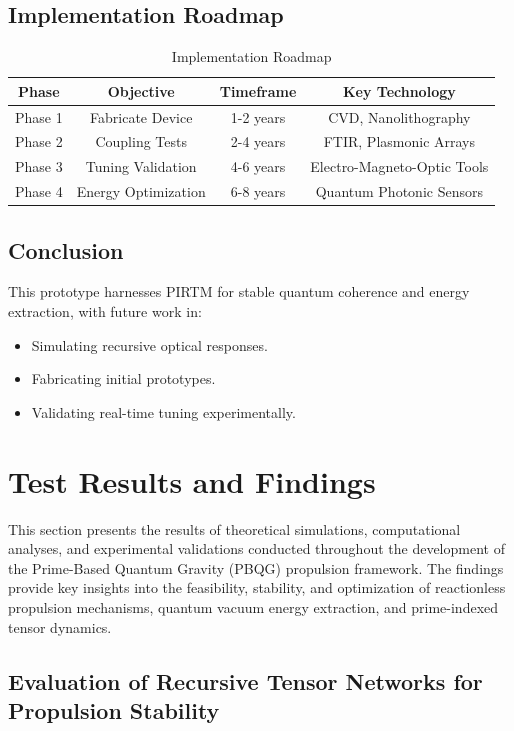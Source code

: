 \documentclass{article}
\theoremstyle{plain}
\begin{document}
\subsection{Implementation Roadmap}
\begin{table}[h]
    \centering
    \begin{tabular}{|c|c|c|c|}
        \hline
        \textbf{Phase} & \textbf{Objective} & \textbf{Timeframe} & \textbf{Key Technology} \\
        \hline
        Phase 1 & Fabricate Device & 1-2 years & CVD, Nanolithography \\
        Phase 2 & Coupling Tests & 2-4 years & FTIR, Plasmonic Arrays \\
        Phase 3 & Tuning Validation & 4-6 years & Electro-Magneto-Optic Tools \\
        Phase 4 & Energy Optimization & 6-8 years & Quantum Photonic Sensors \\
        \hline
    \end{tabular}
    \caption{Implementation Roadmap}
\end{table}

\subsection{Conclusion}
This prototype harnesses PIRTM for stable quantum coherence and energy extraction, with future work in:
\begin{itemize}
    \item Simulating recursive optical responses.
    \item Fabricating initial prototypes.
    \item Validating real-time tuning experimentally.
\end{itemize}
\section{Test Results and Findings}
\label{sec:test_results}

This section presents the results of theoretical simulations, computational analyses, and experimental validations conducted throughout the development of the Prime-Based Quantum Gravity (PBQG) propulsion framework. The findings provide key insights into the feasibility, stability, and optimization of reactionless propulsion mechanisms, quantum vacuum energy extraction, and prime-indexed tensor dynamics.

\subsection{Evaluation of Recursive Tensor Networks for Propulsion Stability}
\label{subsec:tensor_results}
\end{document}
